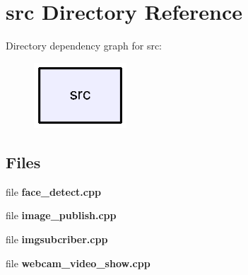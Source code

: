 \section{src Directory Reference}
\label{dir_68267d1309a1af8e8297ef4c3efbcdba}
Directory dependency graph for src\-:
\nopagebreak
\begin{figure}[H]
\begin{center}
\leavevmode
\includegraphics[width=98pt]{dir_68267d1309a1af8e8297ef4c3efbcdba_dep}
\end{center}
\end{figure}
\subsection*{Files}
\begin{DoxyCompactItemize}
\item 
file {\bf face\-\_\-detect.\-cpp}
\item 
file {\bf image\-\_\-publish.\-cpp}
\item 
file {\bf imgsubcriber.\-cpp}
\item 
file {\bf webcam\-\_\-video\-\_\-show.\-cpp}
\end{DoxyCompactItemize}
